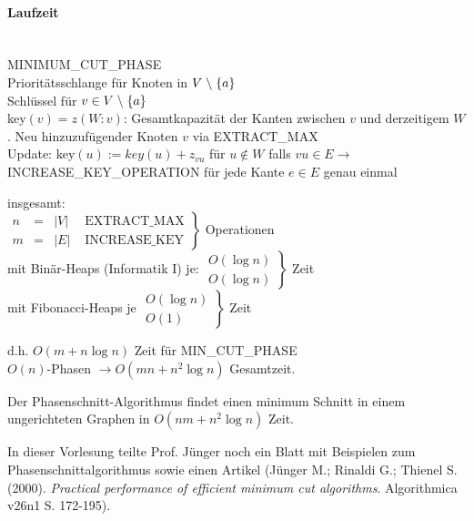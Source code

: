 \paragraph{Laufzeit} \mbox{}\\
MINIMUM\_CUT\_PHASE\\
Prioritätsschlange für Knoten in $V\;\backslash\; \{a\}$\\
\mbox{} \hspace{3mm}Schlüssel für $v \in V \;\backslash\; \{a\}$\\
\mbox{} \hspace{6mm} key$(v) = z(W:v)$: Gesamtkapazität der Kanten zwischen
$v$ und derzeitigem $W$.
Neu hinzuzufügender Knoten $v$ via EXTRACT\_MAX\\
Update: key$(u) := key(u) + z_{v u}$ für $u \not \in W$ falls $v u \in E
\rightarrow$ INCREASE\_KEY\_OPERATION für jede Kante $e \in E$ genau einmal

insgesamt:\\
$\left. \begin{array}{rcll} n&=& |V| &\mbox{ EXTRACT\_MAX}\\
m&=& |E| &\mbox{ INCREASE\_KEY}\end{array} \right\}$ Operationen\\
mit Binär-Heaps (Informatik I) je:
$\left. \begin{array}{l} O(\log n)\\O(\log n)\end{array}\right\}$ Zeit\\
mit Fibonacci-Heaps je
$\left. \begin{array}{l}O(\log n)\\O(1)\end{array}\right\}$ Zeit

d.h. $O(m+n \log n)$ Zeit für MIN\_CUT\_PHASE\\
$O(n)$-Phasen $\rightarrow  O(m n + n^{2}\log n)$ Gesamtzeit.

\begin{satz}
Der Phasenschnitt-Algorithmus findet einen minimum Schnitt in einem
ungerichteten Graphen in $O(n m+n^{2}\log n)$ Zeit.
\end{satz}

In dieser Vorlesung teilte Prof. Jünger noch ein Blatt mit Beispielen zum
Phasenschnittalgorithmus sowie einen Artikel (Jünger M.; Rinaldi G.;
Thienel S. (2000). {\it Practical performance of efficient minimum cut
algorithms}. Algorithmica v26n1 S. 172-195).


